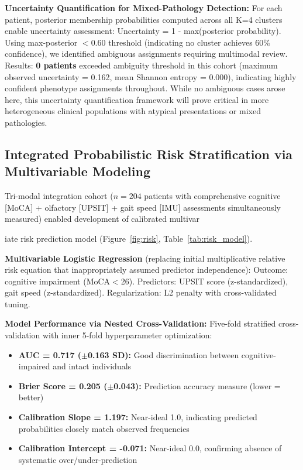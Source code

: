 \documentclass[11pt]{article}
\begin{document}
\textbf{Uncertainty Quantification for Mixed-Pathology Detection:} For each patient, posterior membership probabilities computed across all K=4 clusters enable uncertainty assessment: Uncertainty = 1 - max(posterior probability). Using max-posterior $<$0.60 threshold (indicating no cluster achieves 60\% confidence), we identified ambiguous assignments requiring multimodal review. Results: \textbf{0 patients} exceeded ambiguity threshold in this cohort (maximum observed uncertainty = 0.162, mean Shannon entropy = 0.000), indicating highly confident phenotype assignments throughout. While no ambiguous cases arose here, this uncertainty quantification framework will prove critical in more heterogeneous clinical populations with atypical presentations or mixed pathologies.

\subsection{Integrated Probabilistic Risk Stratification via Multivariable Modeling}

Tri-modal integration cohort ($n=204$ patients with comprehensive cognitive [MoCA] + olfactory [UPSIT] + gait speed [IMU] assessments simultaneously measured) enabled development of calibrated multivar

iate risk prediction model (Figure~\ref{fig:risk}, Table~\ref{tab:risk_model}).

\textbf{Multivariable Logistic Regression} (replacing initial multiplicative relative risk equation that inappropriately assumed predictor independence): Outcome: cognitive impairment (MoCA$<$26). Predictors: UPSIT score (z-standardized), gait speed (z-standardized). Regularization: L2 penalty with cross-validated tuning.

\textbf{Model Performance via Nested Cross-Validation:} Five-fold stratified cross-validation with inner 5-fold hyperparameter optimization:
\begin{itemize}
\item \textbf{AUC = 0.717 ($\pm$0.163 SD):} Good discrimination between cognitive-impaired and intact individuals
\item \textbf{Brier Score = 0.205 ($\pm$0.043):} Prediction accuracy measure (lower = better)
\item \textbf{Calibration Slope = 1.197:} Near-ideal 1.0, indicating predicted probabilities closely match observed frequencies
\item \textbf{Calibration Intercept = -0.071:} Near-ideal 0.0, confirming absence of systematic over/under-prediction
\end{itemize}
\end{document}
